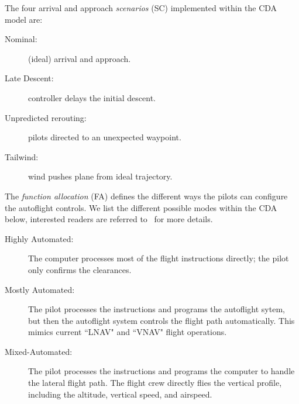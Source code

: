 \documentclass[journal]{IEEEtran}
\newcommand{\be}{\begin{enumerate}}
\newcommand{\ee}{\end{enumerate}}
\newenvironment{changed}{\par}{\par}
\begin{document}
The four arrival and approach \emph{scenarios} (SC) implemented within the CDA model are:    
\begin{description}
\item[Nominal:] (ideal) arrival and approach.
\item[Late Descent:] controller delays the initial descent.
\item[Unpredicted rerouting:]  pilots  directed to an unexpected waypoint.
\item[Tailwind:] wind  pushes  plane from  ideal trajectory.
\end{description} 
The {\em function allocation} (FA) defines the different ways the pilots can configure the autoflight controls.  We list the different possible modes within the CDA below, interested readers are referred to~\cite{Pritchett2014} for more details.
\begin{description}
\item[Highly Automated:] The computer processes most of the flight instructions directly; the pilot only confirms the clearances.
\item[Mostly Automated:] The pilot processes the instructions and programs the autoflight sytem, but then the autoflight system controls the flight path automatically.  This mimics current ``LNAV" and ``VNAV" flight operations.
\item[Mixed-Automated:] The pilot processes the instructions and programs the computer to handle the lateral flight path. The flight crew directly flies the vertical profile, including the altitude, vertical speed, and airspeed.
\end{description} 
\end{document}

